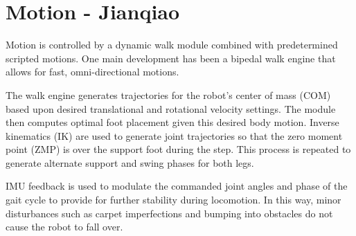 \documentclass{article}
\begin{document}

\section{Motion - Jianqiao}
	Motion is controlled by a dynamic walk module combined with predetermined scripted motions. One main development has been a bipedal walk engine that allows for fast, omni-directional motions.

	The walk engine generates trajectories for the robot's center of mass (COM) based upon desired translational and rotational velocity settings. The module then computes optimal foot placement given this desired body motion. Inverse kinematics (IK) are used to generate joint trajectories so that the zero moment point (ZMP) is over the support foot during the step. This process is repeated to generate alternate support and swing phases for both legs.

	IMU feedback is used to modulate the commanded joint angles and phase of the gait cycle to provide for further stability during locomotion. In this way, minor disturbances such as carpet imperfections and bumping into obstacles do not cause the robot to fall over.
\end{document}
